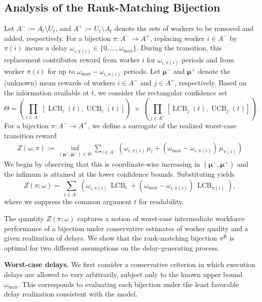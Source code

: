 \documentclass[opre,blindrev]{informs3}
\newcommand{\UCB}{\operatorname{UCB}}
\newcommand{\LCB}{\operatorname{LCB}}
\begin{document}
\begin{APPENDICES}
\section{Analysis of the Rank-Matching Bijection} \label{sec:bijection_analysis}
Let \(A^- := A_t \setminus U_\ell\), and \(A^+ := U_\ell \setminus A_t\) denote the sets of workers to be removed and added, respectively. For a bijection \(\pi : A^- \to A^+\), replacing worker \(i \in A^-\) by \(\pi(i)\) incurs a delay \(\omega_{i,\pi(i)} \in \{0,\dots,\omega_{\max}\}\). During the transition, this replacement contributes reward from worker \(i\) for \(\omega_{i,\pi(i)}\) periods and from worker \(\pi(i)\) for up to \(\omega_{\max}-\omega_{i,\pi(i)}\) periods. Let \(\boldsymbol{\mu}^-\) and \(\boldsymbol{\mu}^+\) denote the (unknown) mean rewards of workers \(i \in A^{-}\) and \(j \in A^{+}\), respectively. Based on the information available at \(t\), we consider the rectangular confidence set
\[
    \Theta=\left(\prod_{i\in A^{-}} [\LCB_i(t), \UCB_i(t)]\right)
    \;\times\;\left(\prod_{j\in A^{+}} [\LCB_j(t), \UCB_j(t)]\right).
\]
For a bijection \(\pi:A^- \to A^+\), we define a surrogate of the realized worst-case transition reward
\begin{align*}
    Z(\omega, \pi):=
    \inf_{(\boldsymbol{\mu}^-,\boldsymbol{\mu}^+)\in\Theta}\sum_{i\in A^-}\left(\omega_{i,\pi(i)}\,\mu_i+(\omega_{\max}-\omega_{i,\pi(i)})\,\mu_{\pi(i)}\right)
\end{align*}
We begin by observing that this is coordinate-wise increasing in \((\boldsymbol{\mu}^-,\boldsymbol{\mu}^+)\) and the infimum is attained at the lower confidence bounds. Substituting yields
\[Z(\pi;\omega )=
    ~\sum_{i\in A^-}\left(\omega_{i,\pi(i)}\,\LCB_i+(\omega_{\max}-\omega_{i,\pi(i)})\,\LCB_{\pi(i)}\right),\]
where we suppress the common argument \(t\) for readability. 

The quantity \(Z(\pi;\omega)\) captures a notion of worst-case intermediate workforce performance of a bijection under conservative estimates of worker quality and a given realization of delays. We show that the rank-matching bijection \(\pi^{\mathrm{R}}\) is optimal for two different assumptions on the delay-generating process.

{\bf Worst-case delays.}
We first consider a conservative criterion in which execution delays are allowed to vary arbitrarily, subject only to the known upper bound \(\omega_{\max}\). This corresponds to evaluating each bijection under the least favorable delay realization consistent with the model.


\end{APPENDICES}
\end{document}
